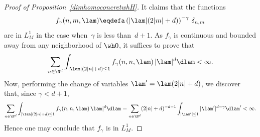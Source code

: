 \begin{proof}[Proof of Proposition~\ref{dimhomoconcretwhH}] It claims that the functions
\[
f_\gamma (n,m,\lam) \eqdefa \left(|\lam| (2|m|+d)\right) ^{-\gamma} \, \delta_{n,m}
\]
are in $L^1_M$ in the case when~$\gamma$ is less than~$d+1$. As $f_\gamma$ is continuous and bounded away from any neighborhood of $\wh 0$, it suffices to prove that
\[
\sum_{n\in \N^d} \int_{|\lam| (2|n|+d)\leq 1} f_\gamma(n,n,\lam)\, |\lam|^d \dlam <\infty.
\]
Now, performing the change of variables $ \lam' = \lam (2|n|+d)$, we discover that, since $\gamma<d+1$,
\[
\sum_{n\in \N^d} \int_{|\lam| (2|n|+d)\leq 1} f_\gamma(n,n,\lam)\,\lam|^d \dlam = \sum_{n\in \N^d} (2|n|+d)^{-d-1} \int_{|\lam'|\leq 1} |\lam'| ^{d-\gamma} \dlam'<\infty.
\]
Hence one may conclude that $f_\gamma$ is in $L^1_M$.
\end{proof}

